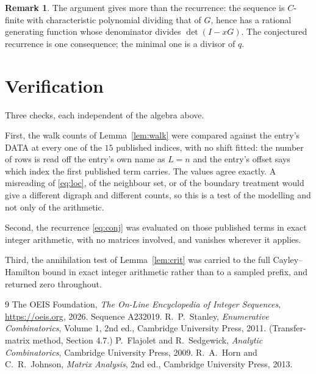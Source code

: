 \documentclass[11pt,a4paper]{article}
\theoremstyle{plain}
\theoremstyle{definition}
\newtheorem{remark}[theorem]{Remark}
\begin{document}
\begin{remark}
The argument gives more than the recurrence: the sequence is $C$-finite with characteristic
polynomial dividing that of $G$, hence has a rational generating function whose denominator
divides $\det(I-xG)$. The conjectured recurrence is one consequence; the minimal one is a
divisor of $q$.
\end{remark}

\section{Verification}

Three checks, each independent of the algebra above.

First, the walk counts of Lemma~\ref{lem:walk} were compared against the entry's DATA at
every one of the $15$ published indices, with no shift fitted: the number of rows is
read off the entry's own name as $L=n$ and the entry's offset says which index the first
published term carries. The values agree exactly. A misreading of \eqref{eq:loc}, of the
neighbour set, or of the boundary treatment would give a different digraph and different
counts, so this is a test of the modelling and not only of the arithmetic.

Second, the recurrence \eqref{eq:conj} was evaluated on those published terms in exact
integer arithmetic, with no matrices involved, and vanishes wherever it applies.

Third, the annihilation test of Lemma~\ref{lem:crit} was carried to the full
Cayley--Hamilton bound in exact integer arithmetic rather than to a sampled prefix, and
returned zero throughout.

\begin{thebibliography}{9}
 The OEIS Foundation, \emph{The On-Line Encyclopedia of Integer
Sequences}, \url{https://oeis.org}, 2026. Sequence A232019.
 R.~P.~Stanley, \emph{Enumerative Combinatorics}, Volume 1, 2nd ed.,
Cambridge University Press, 2011. (Transfer-matrix method, Section 4.7.)
 P.~Flajolet and R.~Sedgewick, \emph{Analytic Combinatorics}, Cambridge
University Press, 2009.
 R.~A.~Horn and C.~R.~Johnson, \emph{Matrix Analysis}, 2nd ed., Cambridge
University Press, 2013.
\end{thebibliography}
\end{document}
